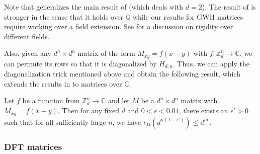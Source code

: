 \documentclass{toc}
\renewcommand\Q{{\mathbb{Q}}}
\renewcommand\Z{{\mathbb{Z}}}
\renewcommand\C{{\mathbb{C}}}
\begin{document}
Note that  generalizes the main result of \cite{old_hadamard}
%
%
(which deals with $d = 2$).   %
%
%
%
%
%
The result of \cite{old_hadamard} is stronger in the sense that it holds over $\Q$ while our results for GWH matrices require working over a field extension.  See  for a
%
discussion on rigidity over different fields.
%

Also, given any $d^n \times d^n$ matrix of the form $M_{xy} = f(x - y)$ with  $f:\Z_d^n  \rightarrow \C$, we can permute its rows so that it is diagonalized by $H_{d,n}$.  Thus, we can apply the diagonalization trick mentioned above and obtain the following result, which extends
%
the results  %
in \cite{CLP} to matrices over $\C$.
\begin{corollary}\label{additive_informal}
Let $f$ be a function from $\Z_d^n \rightarrow \C$ and let $M$ be a $d^n \times d^n$ matrix with $M_{xy} = f(x - y)$.  Then for any fixed $d$ and $0 < \epsilon < 0.01$, there exists an $\epsilon' > 0$ such that for all sufficiently large $n$, %
we have %
$\textsf{r}_{M}\left( d^{n(1 - \epsilon')} \right) \leq d^{n\epsilon}$.
\end{corollary}

\subsubsection{DFT matrices} 
\end{document}
